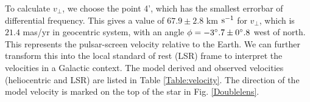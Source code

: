 \documentclass[useAMS,usenatbib]{mn2e}
\begin{document}
To calculate $v_{\bot}$, we choose the point 4', which has the smallest errorbar of differential frequency.
This gives a value of  $67.9\pm 2.8$ km $\rm s^{-1}$ for $v_{\perp}$,  which is $21.4$ mas/yr in geocentric system, with an angle
$\phi=-3\degree.7 \pm 0\degree.8$ west of north.  This represents the
pulsar-screen velocity relative to the Earth.  We can further
transform this into the local standard of rest (LSR) frame to
interpret the velocities in a Galactic context.
The model derived and observed velocities (heliocentric and LSR) are listed in Table \ref{Table:velocity}.  The
direction of the model velocity is marked on the top of the star in
Fig. \ref{Doublelens}. 

\end{document}
